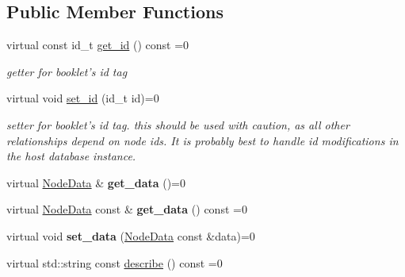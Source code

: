 \subsection*{Public Member Functions}
\begin{DoxyCompactItemize}
\item 
virtual const id\+\_\+t \hyperlink{structfb_1_1_i_face_booklet_node_a651a6fb7445f8d2c046066c1d381f424}{get\+\_\+id} () const =0
\begin{DoxyCompactList}\small\item\em getter for booklet's id tag \end{DoxyCompactList}\item 
virtual void \hyperlink{structfb_1_1_i_face_booklet_node_a944a07a514d6c88414c533dc7be3193d}{set\+\_\+id} (id\+\_\+t id)=0
\begin{DoxyCompactList}\small\item\em setter for booklet's id tag.  this should be used with caution, as all other relationships depend on node ids. It is probably best to handle id modifications in the host database instance. \end{DoxyCompactList}\item 
\hypertarget{structfb_1_1_i_face_booklet_node_acfe552a2e1c8b67bb2ffeb22e319251d}{virtual \hyperlink{classfb_1_1_node_data}{Node\+Data} \& {\bfseries get\+\_\+data} ()=0}\label{structfb_1_1_i_face_booklet_node_acfe552a2e1c8b67bb2ffeb22e319251d}

\item 
\hypertarget{structfb_1_1_i_face_booklet_node_a5f41418b1a6d7100b6ab340a63046713}{virtual \hyperlink{classfb_1_1_node_data}{Node\+Data} const \& {\bfseries get\+\_\+data} () const =0}\label{structfb_1_1_i_face_booklet_node_a5f41418b1a6d7100b6ab340a63046713}

\item 
\hypertarget{structfb_1_1_i_face_booklet_node_a715b1a3ece12f6cf4fcb115c0cd6db5e}{virtual void {\bfseries set\+\_\+data} (\hyperlink{classfb_1_1_node_data}{Node\+Data} const \&data)=0}\label{structfb_1_1_i_face_booklet_node_a715b1a3ece12f6cf4fcb115c0cd6db5e}

\item 
\hypertarget{structfb_1_1_i_face_booklet_node_a4ccb08dfa3ae0af8836cec58f8439adc}{virtual std\+::string const \hyperlink{structfb_1_1_i_face_booklet_node_a4ccb08dfa3ae0af8836cec58f8439adc}{describe} () const =0}\label{structfb_1_1_i_face_booklet_node_a4ccb08dfa3ae0af8836cec58f8439adc}


\end{DoxyCompactItemize}
